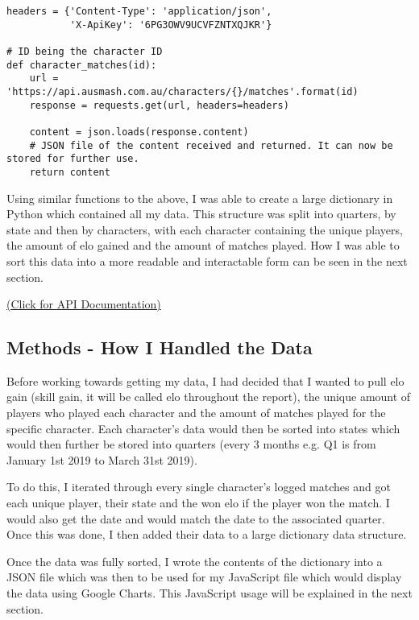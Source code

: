 \documentclass[11pt, oneside, a4paper]{article}
\begin{document}
\begin{lstlisting}    
headers = {'Content-Type': 'application/json',
           'X-ApiKey': '6PG3OWV9UCVFZNTXQJKR'}

# ID being the character ID
def character_matches(id):
    url = 'https://api.ausmash.com.au/characters/{}/matches'.format(id)
    response = requests.get(url, headers=headers)
    
    content = json.loads(response.content)
    # JSON file of the content received and returned. It can now be stored for further use.
    return content

\end{lstlisting}

Using similar functions to the above, I was able to create a large dictionary in Python which contained all my data. This structure was split into quarters, by state and then by characters, with each character containing the unique players, the amount of elo gained and the amount of matches played. How I was able to sort this data into a more readable and interactable form can be seen in the next section.

\href{https://api.ausmash.com.au/swagger/ui/index#/}{(Click for API Documentation)}

\subsection{Methods - How I Handled the Data}
Before working towards getting my data, I had decided that I wanted to pull elo gain (skill gain, it will be called elo throughout the report), the unique amount of players who played each character and the amount of matches played for the specific character. Each character's data would then be sorted into states which would then further be stored into quarters (every 3 months e.g. Q1 is from January 1st 2019 to March 31st 2019).

To do this, I iterated through every single character's logged matches and got each unique player, their state and the won elo if the player won the match. I would also get the date and would match the date to the associated quarter. Once this was done, I then added their data to a large dictionary data structure.

Once the data was fully sorted, I wrote the contents of the dictionary into a JSON file which was then to be used for my JavaScript file which would display the data using Google Charts. This JavaScript usage will be explained in the next section.
\end{document}
